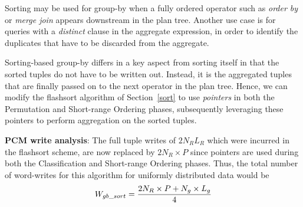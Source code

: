 Sorting may be used for group-by when a fully ordered operator such
as \textit{order by} or \textit{merge join} appears downstream in the plan
tree. Another use case is for queries with a \textit{distinct} clause
in the aggregate expression, in order to identify the duplicates that have
to be discarded from the aggregate.  

Sorting-based group-by differs in a key aspect from sorting itself
in that the sorted tuples do not have to be written out. Instead, it
is the aggregated tuples that are finally passed on to the next operator
in the plan tree. Hence, we can modify the flashsort algorithm of
Section~\ref{sort} to use \emph{pointers} in both the
Permutation and Short-range Ordering phases, subsequently leveraging these
pointers to perform aggregation on the sorted tuples. 

\textbf{PCM write analysis}: The full tuple writes of $2 N_R L_R$
which were incurred in the flashsort scheme, are
now replaced by $2N_R \times P$ since pointers are used during
both the Classification and Short-range Ordering phases. Thus, the total number of word-writes for this
algorithm for uniformly distributed data would be
\begin{equation}
\label{eq:gb_sort}
W_{gb\_sort} = \frac{2N_R \times P + N_g \times L_g}{4}
\end{equation}
